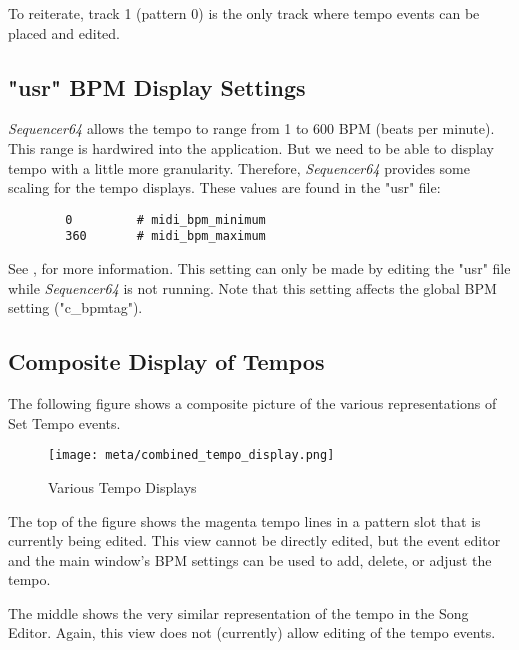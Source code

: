    To reiterate, track 1 (pattern 0) is the only track where tempo events
   can be placed and edited.

\subsection{"usr" BPM Display Settings}
\label{subsec:meta_events_usr}

   \textsl{Sequencer64} allows the tempo to range from 1 to 600 BPM
   (beats per minute).    This range is hardwired into the application.
   But we need to be able to display tempo with a little more granularity.
   Therefore, \textsl{Sequencer64} provides some scaling for the tempo
   displays.  These values are found in the "usr" file:

   \begin{verbatim}
		0         # midi_bpm_minimum
		360       # midi_bpm_maximum
   \end{verbatim}

   See , for more
   information.  This setting can only be made by editing the "usr" file
   while \textsl{Sequencer64} is not running.
   Note that this setting affects the global BPM setting ("c\_bpmtag").


\subsection{Composite Display of Tempos}
\label{subsec:meta_events_composite_display}

The following figure shows a composite picture of the various representations
of Set Tempo events.

\begin{figure}[H]
   \centering 
   \texttt{[image: meta/combined\_tempo\_display.png]}
   \caption{Various Tempo Displays}
   \label{fig:meta_events_tempo_displays}
\end{figure}

The top of the figure shows the magenta tempo lines in a pattern slot that
is currently being edited.  This view cannot be directly edited, but the event
editor and the main window's BPM settings can be used to add, delete, or adjust
the tempo.

The middle shows the very similar representation of the tempo in the Song
Editor.  Again, this view does not (currently) allow editing of the tempo
events.

